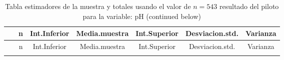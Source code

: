 \documentclass[
]{article}
\begin{document}
\begin{longtable}[]{@{}ccccccc@{}}
\caption{Tabla estimadores de la muestra y totales usando el valor de
\(n = 543\) resultado del piloto para la variable: pH (continued
below)}\tabularnewline
\toprule
\begin{minipage}[b]{0.20\columnwidth}\centering
~\strut
\end{minipage} & \begin{minipage}[b]{0.04\columnwidth}\centering
n\strut
\end{minipage} & \begin{minipage}[b]{0.11\columnwidth}\centering
Int.Inferior\strut
\end{minipage} & \begin{minipage}[b]{0.12\columnwidth}\centering
Media.muestra\strut
\end{minipage} & \begin{minipage}[b]{0.11\columnwidth}\centering
Int.Superior\strut
\end{minipage} & \begin{minipage}[b]{0.13\columnwidth}\centering
Desviacion.std.\strut
\end{minipage} & \begin{minipage}[b]{0.09\columnwidth}\centering
Varianza\strut
\end{minipage}\tabularnewline
\midrule
\endfirsthead
\toprule
\begin{minipage}[b]{0.20\columnwidth}\centering
~\strut
\end{minipage} & \begin{minipage}[b]{0.04\columnwidth}\centering
n\strut
\end{minipage} & \begin{minipage}[b]{0.11\columnwidth}\centering
Int.Inferior\strut
\end{minipage} & \begin{minipage}[b]{0.12\columnwidth}\centering
Media.muestra\strut
\end{minipage} & \begin{minipage}[b]{0.11\columnwidth}\centering
Int.Superior\strut
\end{minipage} & \begin{minipage}[b]{0.13\columnwidth}\centering
Desviacion.std.\strut
\end{minipage} & \begin{minipage}[b]{0.09\columnwidth}\centering
Varianza\strut
\end{minipage}\tabularnewline
\midrule
\endhead
\begin{minipage}[t]{0.20\columnwidth}\centering

\end{minipage}
\end{longtable}
\end{document}
